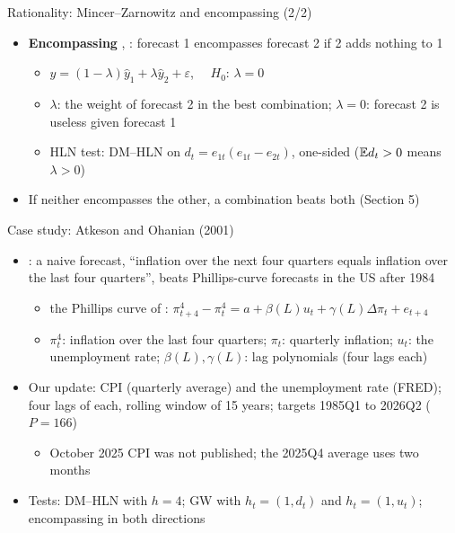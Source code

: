 \begin{frame}{Rationality: Mincer--Zarnowitz and encompassing (2/2)}
\itemsize{\small}
\begin{itemize}
    \item \textbf{Encompassing} , : forecast 1 encompasses forecast 2 if 2 adds nothing to 1
    \begin{itemize}
        \item $y = (1 - \lambda)\hat y_1 + \lambda\hat y_2 + \varepsilon$, $\quad H_0$: $\lambda = 0$
        \item $\lambda$: the weight of forecast 2 in the best combination; $\lambda = 0$: forecast 2 is useless given forecast 1
        \item HLN test: DM--HLN on $d_t = e_{1t}(e_{1t} - e_{2t})$, one-sided ($\mathbb{E} d_t > 0$ means $\lambda > 0$)
    \end{itemize}
    \item If neither encompasses the other, a combination beats both (Section 5)
\end{itemize}
\end{frame}

\begin{frame}{Case study: Atkeson and Ohanian (2001)}
\itemsize{\small}
\begin{itemize}
    \item {}: a naive forecast, ``inflation over the next four quarters equals inflation over the last four quarters'', beats Phillips-curve forecasts in the US after 1984
    \begin{itemize}
        \item the Phillips curve of : $\pi^4_{t+4} - \pi^4_t = a + \beta(L)u_t + \gamma(L)\Delta\pi_t + e_{t+4}$
        \item $\pi^4_t$: inflation over the last four quarters; $\pi_t$: quarterly inflation; $u_t$: the unemployment rate; $\beta(L), \gamma(L)$: lag polynomials (four lags each)
    \end{itemize}
    \item Our update: CPI (quarterly average) and the unemployment rate (FRED); four lags of each, rolling window of 15 years; targets 1985Q1 to 2026Q2 ($P = 166$)
    \begin{itemize}
        \item October 2025 CPI was not published; the 2025Q4 average uses two months
    \end{itemize}
    \item Tests: DM--HLN with $h = 4$; GW with $h_t = (1, d_{t})$ and $h_t = (1, u_t)$; encompassing in both directions
\end{itemize}
\end{frame}

